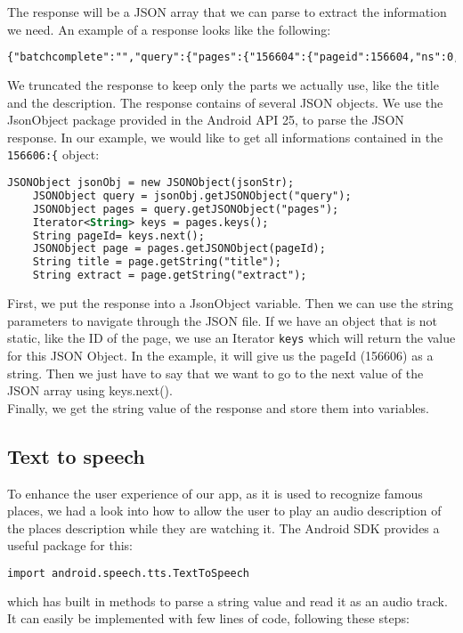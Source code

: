 The response will be a JSON array that we can parse to extract the information we need. An example of a response looks like the following:
\begin{lstlisting}[language=XML, basicstyle=\scriptsize]
    {"batchcomplete":"","query":{"pages":{"156604":{"pageid":156604,"ns":0,"title": "Brandenburg Gate","extract":"The Brandenburg Gate (German: Brandenburger Tor) is an 18th-century neoclassical monument in Berlin, and one of the best-known landmarks of Germany. It is built on the site of a former city gate that marked the start of the road from Berlin to the town of Brandenburg an der Havel....\n"}}}}
\end{lstlisting}
We truncated the response to keep only the parts we actually use, like the title and the description. The response contains of several JSON objects. We use the JsonObject package provided in the Android API 25, to parse the JSON response. In our example, we would like to get all informations contained in the \texttt{156606:\{} object:
\begin{lstlisting}[language=XML, basicstyle=\scriptsize]
    JSONObject jsonObj = new JSONObject(jsonStr);
    JSONObject query = jsonObj.getJSONObject("query");
    JSONObject pages = query.getJSONObject("pages");
    Iterator<String> keys = pages.keys();
    String pageId= keys.next();
    JSONObject page = pages.getJSONObject(pageId);
    String title = page.getString("title");
    String extract = page.getString("extract");
\end{lstlisting}
First, we put the response into a JsonObject variable. Then we can use the string parameters to navigate through the JSON file. If we have an object that is not static, like the ID of the page, we use an Iterator \texttt{keys} which will return the value for this JSON Object. In the example, it will give us the pageId (156606) as a string. Then we just have to say that we want to go to the next value of the JSON array using keys.next().\\
Finally, we get the string value of the response and store them into variables.

\subsection{Text to speech}
To enhance the user experience of our app, as it is used to recognize famous places, we had a look into how to allow the user to play an audio description of the places description while they are watching it. The Android SDK provides a useful package for this:
\begin{lstlisting}[language=XML, basicstyle=\scriptsize]
    import android.speech.tts.TextToSpeech
\end{lstlisting}
which has built in methods to parse a string value and read it as an audio track. It can easily be implemented with few lines of code, following these steps:\\\\

